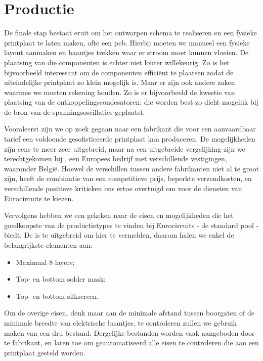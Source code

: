 \section{Productie}

De finale stap bestaat eruit om het ontworpen schema te realiseren en een fysieke printplaat te laten maken, ofte een \ac{pcb}. Hierbij moeten we manueel een fysieke layout aanmaken en baantjes trekken waar er stroom moet kunnen vloeien. De plaatsing van die componenten is echter niet louter willekeurig. Zo is het bijvoorbeeld interessant om de componenten efficiënt te plaatsen zodat de uiteindelijke printplaat zo klein mogelijk is. Maar er zijn ook andere zaken waarmee we moeten rekening houden. Zo is er bijvoorbeeld de kwestie van plaatsing van de ontkoppelingscondesatoren: die worden best zo dicht mogelijk bij de bron van de spanningsoscillaties geplaatst.

Vooraleerst zijn we op zoek gegaan naar een fabrikant die voor een aanvaardbaar tarief een voldoende gesofisticeerde printplaat kan produceren. De mogelijkheden zijn eens te meer zeer uitgebreid, maar na een uitgebreide vergelijking zijn we terechtgekomen bij , een Europees bedrijf met verschillende vestigingen, waaronder België. Hoewel de verschillen tussen andere fabrikanten niet al te groot zijn, heeft de combinatie van een competitieve prijs, beperkte verzendkosten, en verschillende positieve kritieken ons ertoe overtuigd om voor de diensten van Eurocircuits te kiezen.

Vervolgens hebben we een gekeken naar de eisen en mogelijkheden die het goedkoopste van de productietypes te vinden bij Eurocircuits - de standard pool - biedt. De  is te uitgebreid om hier te vermelden, daarom halen we enkel de belangrijkste elementen aan:
\begin{itemize}
\item Maximaal 8 layers;
\item Top- en bottom solder mask;
\item Top- en bottom silkscreen.
\end{itemize}
Om de overige eisen, denk maar aan de minimale afstand tussen boorgaten of de minimale breedte van elektrische baantjes, te controleren zullen we gebruik maken van een \ac{dru} bestand. Dergelijke bestanden worden vaak aangeboden door te fabrikant, en laten toe om geautomatiseerd alle eisen te controleren die aan een printplaat gesteld worden.


